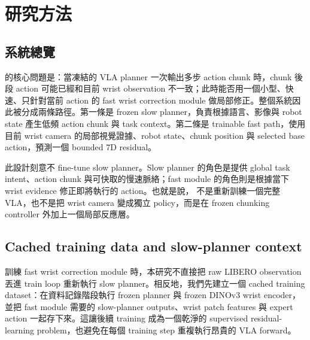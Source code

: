 \chapter{研究方法}
\label{ch:method}

\section{系統總覽}

\method{} 的核心問題是：當凍結的 VLA planner 一次輸出多步 action chunk 時，chunk 後段 action 可能已經和目前 wrist observation 不一致；此時能否用一個小型、快速、只針對當前 action 的 fast wrist correction module 做局部修正。整個系統因此被分成兩條路徑。第一條是 frozen slow planner，負責根據語言、影像與 robot state 產生低頻 action chunk 與 task context。第二條是 trainable fast path，使用目前 wrist camera 的局部視覺證據、robot state、chunk position 與 selected base action，預測一個 bounded 7D residual。

此設計刻意不 fine-tune slow planner。Slow planner 的角色是提供 global task intent、action chunk 與可快取的慢速脈絡；fast module 的角色則是根據當下 wrist evidence 修正即將執行的 action。也就是說，\method{} 不是重新訓練一個完整 VLA，也不是把 wrist camera 變成獨立 policy，而是在 frozen chunking controller 外加上一個局部反應層。

\section{Cached training data and slow-planner context}

訓練 fast wrist correction module 時，本研究不直接把 raw LIBERO observation 丟進 train loop 重新執行 slow planner。相反地，我們先建立一個 cached training dataset：在資料記錄階段執行 frozen planner 與 frozen DINOv3 wrist encoder，並把 fast module 需要的 slow-planner outputs、wrist patch features 與 expert action 一起存下來。這讓後續 training 成為一個乾淨的 supervised residual-learning problem，也避免在每個 training step 重複執行昂貴的 VLA forward。

